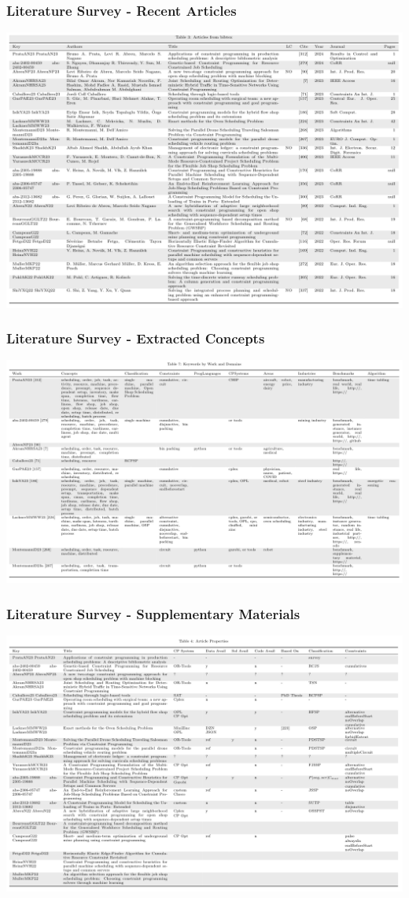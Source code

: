 \documentclass[dvipsnames,aspectratio=169]{beamer}
\begin{document}
\begin{frame}
\frametitle{Literature Survey - Recent Articles}
\includegraphics[width=\textwidth]{images/articles1}
\end{frame}

\begin{frame}
\frametitle{Literature Survey - Extracted Concepts}
\includegraphics[width=.95\textwidth]{images/concepts}
\end{frame}


\begin{frame}
\frametitle{Literature Survey - Supplementary Materials}
\includegraphics[width=\textwidth]{images/articles2}
\end{frame}
\end{document}
